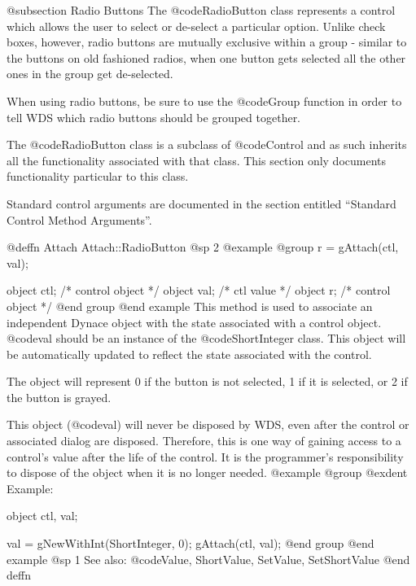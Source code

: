@subsection Radio Buttons
The @code{RadioButton} class represents a control which allows the user
to select or de-select a particular option.  Unlike check boxes, however,
radio buttons are mutually exclusive within a group - similar to the
buttons on old fashioned radios, when one button gets selected all the
other ones in the group get de-selected.

When using radio buttons, be sure to use the @code{Group} function in order
to tell WDS which radio buttons should be grouped together.

The @code{RadioButton} class is a subclass of @code{Control} and as such
inherits all the functionality associated with that class.  This section
only documents functionality particular to this class.

Standard control arguments are documented in the section entitled
``Standard Control Method Arguments''.






@deffn {Attach} Attach::RadioButton
@sp 2
@example
@group
r = gAttach(ctl, val);

object  ctl;   /*  control object  */
object  val;   /*  ctl value       */
object  r;     /*  control object  */
@end group
@end example
This method is used to associate an independent Dynace object with the
state associated with a control object.  @code{val} should be an
instance of the @code{ShortInteger} class.  This object will be
automatically updated to reflect the state associated with the control.

The object will represent 0 if the button is not selected, 1 if it is
selected, or 2 if the button is grayed.

This object (@code{val}) will never be disposed by WDS, even after
the control or associated dialog are disposed.  Therefore, this
is one way of gaining access to a control's value after the life
of the control.  It is the programmer's responsibility to dispose of
the object when it is no longer needed.
@example
@group
@exdent Example:

object  ctl, val;

val = gNewWithInt(ShortInteger, 0);
gAttach(ctl, val);
@end group
@end example
@sp 1
See also:  @code{Value, ShortValue, SetValue, SetShortValue}
@end deffn











